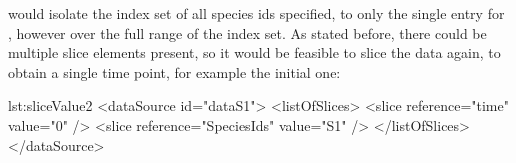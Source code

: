 would isolate the index set of all species ids specified, to only the single entry for , however over the full range of the  index set. As stated before, there could be multiple slice elements present, so it would be feasible to slice the data again, to obtain a single time point, for example the initial one:

%
\begin{myXmlLst}{}{lst:sliceValue2}
        <dataSource id="dataS1">
          <listOfSlices>
            <slice reference="time" value="0" />
            <slice reference="SpeciesIds" value="S1" />
          </listOfSlices>
        </dataSource>
\end{myXmlLst} 
%

